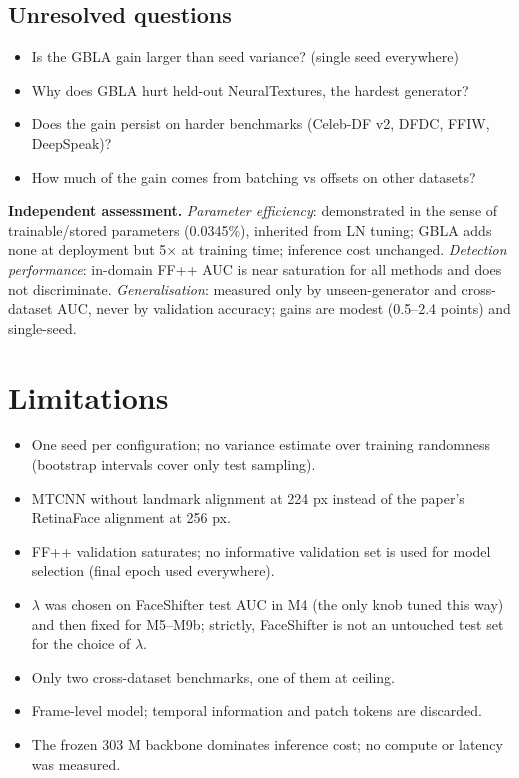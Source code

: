 \documentclass[10pt,a4paper]{article}
\begin{document}
\subsection{Unresolved questions}
\begin{itemize}
\item Is the GBLA gain larger than seed variance? (single seed everywhere)
\item Why does GBLA hurt held-out NeuralTextures, the hardest generator?
\item Does the gain persist on harder benchmarks (Celeb-DF v2, DFDC, FFIW, DeepSpeak)?
\item How much of the gain comes from batching vs offsets on other datasets?
\end{itemize}
\textbf{Independent assessment.} \emph{Parameter efficiency}: demonstrated in the sense of
trainable/stored parameters (0.0345\%), inherited from LN tuning; GBLA adds none at deployment but
5\(\times\) at training time; inference cost unchanged. \emph{Detection performance}: in-domain
FF++ AUC is near saturation for all methods and does not discriminate. \emph{Generalisation}: measured
only by unseen-generator and cross-dataset AUC, never by validation accuracy; gains are modest
(0.5--2.4 points) and single-seed.

\section{Limitations}\label{sec:limits}
\begin{itemize}
\item One seed per configuration; no variance estimate over training randomness (bootstrap intervals
cover only test sampling).
\item MTCNN without landmark alignment at 224 px instead of the paper's RetinaFace alignment at 256 px.
\item FF++ validation saturates; no informative validation set is used for model selection (final
epoch used everywhere).
\item \(\lambda\) was chosen on FaceShifter test AUC in M4 (the only knob tuned this way) and then
fixed for M5--M9b; strictly, FaceShifter is not an untouched test set for the choice of \(\lambda\).
\item Only two cross-dataset benchmarks, one of them at ceiling.
\item Frame-level model; temporal information and patch tokens are discarded.
\item The frozen 303 M backbone dominates inference cost; no compute or latency was measured.
\end{itemize}
\end{document}
